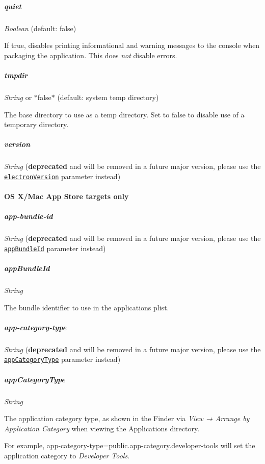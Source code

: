 \subparagraph*{{\ttfamily quiet}}

{\itshape Boolean} (default\+: {\ttfamily false})

If {\ttfamily true}, disables printing informational and warning messages to the console when packaging the application. This does {\itshape not} disable errors.

\subparagraph*{{\ttfamily tmpdir}}

{\itshape String} or $\ast${\ttfamily false}$\ast$ (default\+: system temp directory)

The base directory to use as a temp directory. Set to {\ttfamily false} to disable use of a temporary directory.

\subparagraph*{{\ttfamily version}}

{\itshape String} ({\bfseries deprecated} and will be removed in a future major version, please use the \href{#electronversion}{\tt {\ttfamily electron\+Version}} parameter instead)

\paragraph*{OS X/\+Mac App Store targets only}

\subparagraph*{{\ttfamily app-\/bundle-\/id}}

{\itshape String} ({\bfseries deprecated} and will be removed in a future major version, please use the \href{#appbundleid}{\tt {\ttfamily app\+Bundle\+Id}} parameter instead)

\subparagraph*{{\ttfamily app\+Bundle\+Id}}

{\itshape String}

The bundle identifier to use in the application\textquotesingle{}s plist.

\subparagraph*{{\ttfamily app-\/category-\/type}}

{\itshape String} ({\bfseries deprecated} and will be removed in a future major version, please use the \href{#appcategorytype}{\tt {\ttfamily app\+Category\+Type}} parameter instead)

\subparagraph*{{\ttfamily app\+Category\+Type}}

{\itshape String}

The application category type, as shown in the Finder via {\itshape View → Arrange by Application Category} when viewing the Applications directory.

For example, {\ttfamily app-\/category-\/type=public.\+app-\/category.\+developer-\/tools} will set the application category to {\itshape Developer Tools}.

